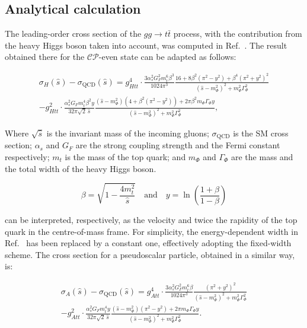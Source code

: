 \subsection{Analytical calculation}
%
The leading-order cross section of the $gg \rightarrow t\bar t$ process, with the contribution from the heavy Higgs boson taken into account, was computed in Ref.~\cite{Dicus:1994bm}.
The result obtained there for the $\mathcal{CP}$-even state can be adapted as follows:
\begin{linenomath}
\begin{multline}
 \sigma_H(\hat{s}) - \sigma_\text{QCD}(\hat{s}) = g_{Htt}^4 \cdot \frac{3 \alpha_s^2 G_F^2 m_t^6 \beta^3}{1024 \pi^3} \frac{16 + 8\beta^2 \left(\pi^2 - y^2\right) + \beta^4 \left(\pi^2 + y^2\right)^2}{\left(\hat{s} - m_{\Phi}^2\right)^2 + m_{\Phi}^2\Gamma_{\Phi}^2} \\
 - g_{Htt}^2 \cdot \frac{\alpha_s^2 G_F m_t^4 \beta^2 y}{32 \pi \sqrt{2}\,\hat{s}} \frac{\left(\hat{s} - m_{\Phi}^2\right) \left(4 + \beta^2 \left(\pi^2 - y^2\right)\right) + 2 \pi \beta^2 m_\Phi \Gamma_\Phi y}{\left(\hat{s} - m_{\Phi}^2\right)^2 + m_{\Phi}^2\Gamma_{\Phi}^2},
 \label{Eq:XSecCPEven}
\end{multline}
\end{linenomath}
Where $\sqrt{\hat s}$ is the invariant mass of the incoming gluons; $\sigma_\text{QCD}$ is the SM cross section; $\alpha_s$ and $G_F$ are the strong coupling strength and the Fermi constant respectively; $m_t$ is the mass of the top quark; and $m_\Phi$ and $\Gamma_\Phi$ are the mass and the total width of the heavy Higgs boson.
\begin{linenomath}
\begin{equation}
 \beta = \sqrt{1 - \frac{4 m_{t}^2}{\hat{s}}}\quad\text{and}\quad y = \ln\left(\frac{1 + \beta}{1 - \beta}\right)
\end{equation}
\end{linenomath}
can be interpreted, respectively, as the velocity and twice the rapidity of the top quark in the centre-of-mass frame.
For simplicity, the energy-dependent width in Ref.~\cite{Dicus:1994bm} has been replaced by a constant one, effectively adopting the fixed-width scheme.
The cross section for a pseudoscalar particle, obtained in a similar way, is:
\begin{linenomath}
\begin{multline}
 \sigma_A(\hat{s}) - \sigma_\text{QCD}(\hat{s}) = g_{Att}^4 \cdot \frac{3 \alpha_s^2 G_F^2 m_{t}^6 \beta}{1024 \pi^3} \frac{\left(\pi^2 + y^2\right)^2}{\left(\hat{s} - m_{\Phi}^2\right)^2 + m_{\Phi}^2\Gamma_{\Phi}^2} \\
 - g_{Att}^2 \cdot \frac{\alpha_s^2 G_F m_{t}^4 y}{32 \pi \sqrt{2}\,\hat{s}} \frac{\left(\hat{s} - m_{\Phi}^2\right) \left(\pi^2 - y^2\right) + 2 \pi m_\Phi \Gamma_\Phi y}{\left(\hat{s} - m_{\Phi}^2\right)^2 + m_{\Phi}^2\Gamma_{\Phi}^2}.
 \label{Eq:XSecCPOdd}
\end{multline}
\end{linenomath}

